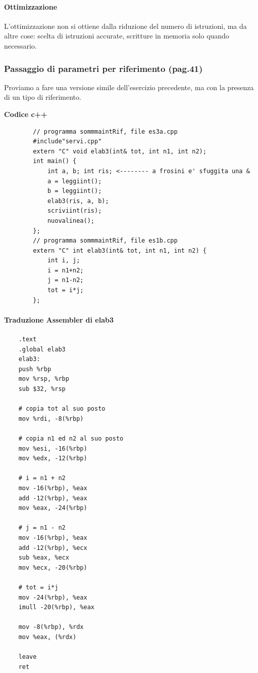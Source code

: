 \paragraph{Ottimizzazione} 
L'ottimizzazione non si ottiene dalla riduzione del numero di istruzioni, ma da altre cose: scelta di istruzioni accurate, scritture in memoria solo quando necessario.

\subsubsection{Passaggio di parametri per riferimento (pag.41)}
Proviamo a fare una versione simile dell'esercizio precedente, ma con la presenza di un tipo di riferimento.
\begin{framed}
	\noindent \textbf{Codice c++}
	\begin{verbatim}
		// programma sommmaintRif, file es3a.cpp
		#include"servi.cpp"
		extern "C" void elab3(int& tot, int n1, int n2);
		int main() { 
			int a, b; int ris; <-------- a frosini e' sfuggita una &
			a = leggiint();
			b = leggiint();
			elab3(ris, a, b);
			scriviint(ris);
			nuovalinea();
		};
		// programma sommmaintRif, file es1b.cpp
		extern "C" int elab3(int& tot, int n1, int n2) { 
			int i, j;
			i = n1+n2;
			j = n1-n2;
			tot = i*j;
		};
	\end{verbatim}
\end{framed}
\paragraph{Traduzione Assembler di elab3}
\begin{verbatim}
	.text
	.global elab3
	elab3:
	push %rbp
	mov %rsp, %rbp
	sub $32, %rsp
	
	# copia tot al suo posto
	mov %rdi, -8(%rbp)
	
	# copia n1 ed n2 al suo posto
	mov %esi, -16(%rbp)
	mov %edx, -12(%rbp)
	
	# i = n1 + n2
	mov -16(%rbp), %eax
	add -12(%rbp), %eax
	mov %eax, -24(%rbp)
	
	# j = n1 - n2
	mov -16(%rbp), %eax
	add -12(%rbp), %ecx
	sub %eax, %ecx
	mov %ecx, -20(%rbp)
	
	# tot = i*j
	mov -24(%rbp), %eax
	imull -20(%rbp), %eax
	
	mov -8(%rbp), %rdx
	mov %eax, (%rdx)
	
	leave
	ret
\end{verbatim}

